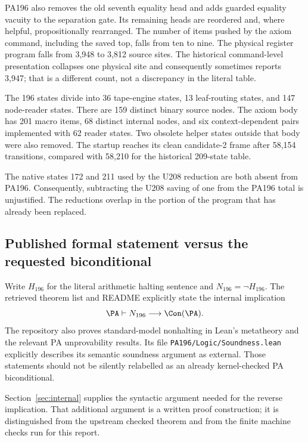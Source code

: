 PA196 also removes the old seventh equality head and adds guarded equality vacuity to the separation gate. Its remaining heads are reordered and, where helpful, propositionally rearranged. The number of items pushed by the axiom command, including the saved top, falls from ten to nine. The physical register program falls from 3,948 to 3,812 source sites. The historical command-level presentation collapses one physical site and consequently sometimes reports 3,947; that is a different count, not a discrepancy in the literal table.

The 196 states divide into 36 tape-engine states, 13 leaf-routing states, and 147 node-reader states. There are 159 distinct binary source nodes. The axiom body has 201 macro items, 68 distinct internal nodes, and six context-dependent pairs implemented with 62 reader states. Two obsolete helper states outside that body were also removed. The startup reaches its clean candidate-2 frame after 58,154 transitions, compared with 58,210 for the historical 209-state table.

The native states 172 and 211 used by the U208 reduction are both absent from PA196. Consequently, subtracting the U208 saving of one from the PA196 total is unjustified. The reductions overlap in the portion of the program that has already been replaced.

\subsection{Published formal statement versus the requested biconditional}
Write \(H_{196}\) for the literal arithmetic halting sentence and \(N_{196}=\neg H_{196}\). The retrieved theorem list and README explicitly state the internal implication
\[
 \PA\vdash N_{196}\longrightarrow\Con(\PA).
\]
The repository also proves standard-model nonhalting in Lean's metatheory and the relevant PA unprovability results. Its file \texttt{PA196/Logic/Soundness.lean} explicitly describes its semantic soundness argument as external. Those statements should not be silently relabelled as an already kernel-checked PA biconditional.

Section~\ref{sec:internal} supplies the syntactic argument needed for the reverse implication. That additional argument is a written proof construction; it is distinguished from the upstream checked theorem and from the finite machine checks run for this report.
